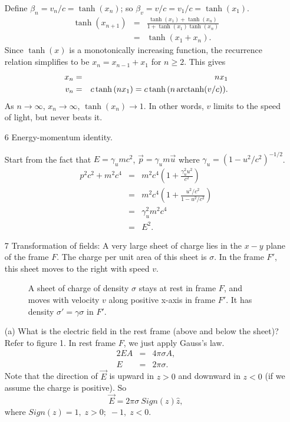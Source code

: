 \begin{enumerate}
Define $\beta_n=v_n/c=\tanh{(x_n)}$; so
$\beta_v=v/c=v_1/c=\tanh{(x_1)}$.
\begin{eqnarray}
\tanh{(x_{n+1})}&=&\frac{\tanh{(x_1)}+\tanh{(x_n)}}{1+\tanh{(x_1)}\tanh{(x_n)}}
\nonumber\\
&=& \tanh{(x_1+x_n)}.
\end{eqnarray}
Since $\tanh{(x)}$ is a monotonically increasing function, the 
recurrence relation simplifies to be $x_n=x_{n-1}+x_1$ for
$n\ge 2$.  This gives 
\begin{eqnarray}
x_n &=& nx_1\\
v_n &=& c\tanh{(nx_1)}=c\tanh{(n\,{\rm arctanh}(v/c))}.
\end{eqnarray}
As $n\rightarrow\infty$, $x_n\rightarrow\infty$,
$\tanh{(x_n)}\rightarrow 1$.  In other words, $v$ limits to the speed
of light, but never beats it.

\item[6] Energy-momentum identity.

Start from the fact that $E=\gamma_u mc^2$, $\vec{p}=\gamma_u
m\vec{u}$ where $\gamma_u=(1-u^2/c^2)^{-1/2}$.
\begin{eqnarray}
p^2 c^2+m^2 c^4 &=& m^2 c^4 (1+\frac{\gamma_u^2 u^2}{c^2})\nonumber\\
&=& m^2 c^4 (1+\frac{u^2/c^2}{1-u^2/c^2})\nonumber\\
&=& \gamma_u^2 m^2 c^4\nonumber\\
&=& E^2.
\end{eqnarray}


\newpage

\item[7] Transformation of fields: A very large sheet of charge 
lies in the $x-y$ plane of the frame $F$. The charge per 
unit area of this sheet is $\sigma$. In the frame $F'$, 
this sheet moves to the right with speed $v$.

\begin{figure}[ht]
\begin{center}
\label{fig:fields10}
\caption{A sheet of charge of density $\sigma$ stays at rest in frame
$F$, and moves with velocity $v$ along positive x-axis in frame $F'$.
It has density $\sigma'=\gamma\sigma$ in $F'$.}
\end{center}
\end{figure}

(a) What is the electric field in the rest frame (above and below the
sheet)?\\

Refer to figure 1.  In rest frame $F$, we just apply Gauss's law.  
\begin{eqnarray}
2EA &=& 4\pi\sigma A,\\
E &=& 2\pi\sigma.
\end{eqnarray}
Note that the direction of $\vec{E}$ is upward in $z>0$ and downward
in $z<0$ (if we assume the charge is positive).  So 
\begin{equation}
\vec{E}=2\pi\sigma\:Sign(z)\hat z,
\end{equation}
where $Sign(z)=1,\;z>0;\;-1,\;z<0$.\\


\end{enumerate}

